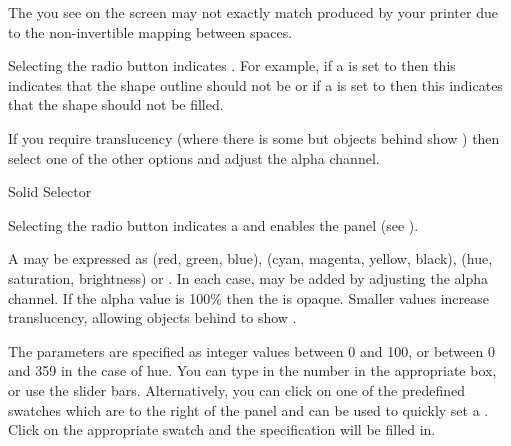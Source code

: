 \begin{warning}
The  you see on the screen may not exactly match
 produced by your printer due to the non-invertible
mapping between  spaces.
\end{warning}


Selecting the  radio button indicates
. For example, if a  is set to
 then this indicates that the \gls{shape}
outline should not be  or if a
 is set to  then
this indicates that the \gls{shape} should not be filled.

If you require \gls{translucency} (where there is some 
but \glspl{object} behind show ) then select one of
the other  options and adjust the alpha channel.


{}
{Solid  Selector}

Selecting the  radio button indicates a
  and enables the
 panel (see ). 

A  may be expressed as
 (red, green, blue),
 (cyan, magenta, yellow, black),
 (hue, saturation, brightness) or
. In each case,
 may be added by adjusting
the alpha channel.  If the alpha value is 100\% then the
 is opaque.  Smaller values increase
\gls{translucency}, allowing \glspl{object} behind to show
.

The parameters are specified as integer values between 0 and 100,
or between 0 and 359 in the case of hue.
You can type in the number in the appropriate box, or use
the slider bars. Alternatively, you can click on one of the predefined swatches
which are to the right of the  panel 
and can be used to quickly set a . Click on the 
appropriate swatch and the  specification will be
filled in.

